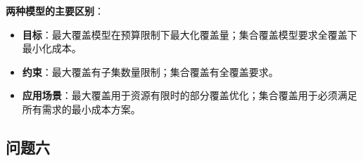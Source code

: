 \documentclass[UTF8]{article}
\begin{document}
\vspace{0.5em}
\textbf{两种模型的主要区别}：
\begin{itemize}[leftmargin=1.5em]
    \item \textbf{目标}：最大覆盖模型在预算限制下最大化覆盖量；集合覆盖模型要求全覆盖下最小化成本。
    \item \textbf{约束}：最大覆盖有子集数量限制；集合覆盖有全覆盖要求。
    \item \textbf{应用场景}：最大覆盖用于资源有限时的部分覆盖优化；集合覆盖用于必须满足所有需求的最小成本方案。
\end{itemize}



\subsection*{问题六}
\end{document}
